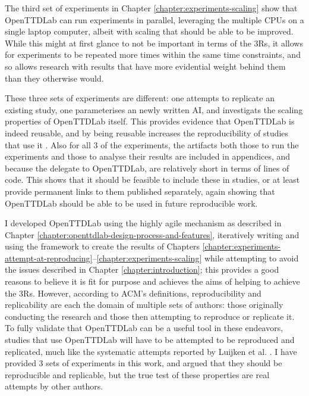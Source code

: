 \documentclass[logo,msc,dsti]{style/infthesis}    %
\begin{document}
{The third set of experiments in Chapter \ref{chapter:experiments-scaling} show that OpenTTDLab can run experiments in parallel, leveraging the multiple CPUs on a single laptop computer, albeit with scaling that should be able to be improved. While this might at first glance to not be important in terms of the 3Rs, it allows for experiments to be repeated more times within the same time constraints, and so allows research with results that have more evidential weight behind them than they otherwise would.

These three sets of experiments are different: one attempts to replicate an existing study, one parameterises an newly written AI, and investigats the scaling properties of OpenTTDLab itself. This provides evidence that OpenTTDLab is indeed reusable, and by being reusable increases the reproducibility of studies that use it \cite{benureau2018re}. Also for all 3 of the experiments, the artifacts both those to run the experiments and those to analyse their results are included in appendices, and because the delegate to OpenTTDLab, are relatively short in terms of lines of code. This shows that it should be feasible to include these in studies, or at least provide permanent links to them published separately, again showing that OpenTTDLab should be able to be used in future reproducible work.

I developed OpenTTDLab using the highly agile mechanism as described in Chapter \ref{chapter:openttdlab-design-process-and-features}, iteratively writing and using the framework to create the results of Chapters \ref{chapter:experiments-attempt-at-reproducing}--\ref{chapter:experiments-scaling} while attempting to avoid the issues described in Chapter \ref{chapter:introduction}; this provides a good reasons to believe it is fit for purpose and achieves the aims of helping to achieve the 3Rs. However, according to ACM's definitions, reproducibility and replicability are each the domain of multiple sets of authors: those originally conducting the research and those then attempting to reproduce or replicate it. To fully validate that OpenTTDLab can be a useful tool in these endeavors, studies that use OpenTTDLab will have to be attempted to be reproduced and replicated, much like the systematic attempts reported by Luijken et al. \cite{luijken2024replicability}. I have provided 3 sets of experiments in this work, and argued that they should be reproducible and replicable, but the true test of these properties are real attempts by other authors.

}
\end{document}
